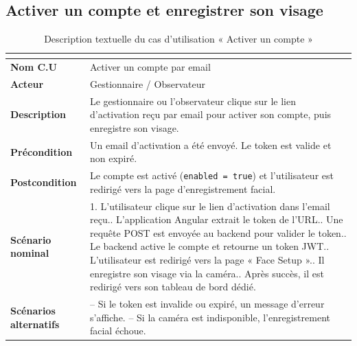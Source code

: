 
\subsection{Activer un compte et enregistrer son visage}

\begin{table}[H]
  \centering
  \caption{Description textuelle du cas d'utilisation « Activer un compte »}
  \label{tab:cu_activate}
  \renewcommand{\arraystretch}{1.4}
  \begin{tabularx}{\textwidth}{|>{\bfseries}l|L|}
    \hline
     \\
    \hline
    Nom C.U & Activer un compte par email \\
    \hline
    Acteur & Gestionnaire / Observateur \\
    \hline
    Description & Le gestionnaire ou l'observateur clique sur le lien d'activation reçu
      par email pour activer son compte, puis enregistre son visage. \\
    \hline
    Précondition & Un email d'activation a été envoyé. Le token est valide et non expiré. \\
    \hline
    Postcondition & Le compte est activé (\texttt{enabled = true}) et l'utilisateur est
      redirigé vers la page d'enregistrement facial. \\
    \hline
    Scénario nominal &
      1. L'utilisateur clique sur le lien d'activation dans l'email reçu.. L'application Angular extrait le token de l'URL.. Une requête POST est envoyée au backend pour valider le token.. Le backend active le compte et retourne un token JWT.. L'utilisateur est redirigé vers la page « Face Setup ».. Il enregistre son visage via la caméra.. Après succès, il est redirigé vers son tableau de bord dédié. \\
    \hline
    Scénarios alternatifs &
      -- Si le token est invalide ou expiré, un message d'erreur s'affiche.\newline
      -- Si la caméra est indisponible, l'enregistrement facial échoue. \\
    \hline
  \end{tabularx}
\end{table}

